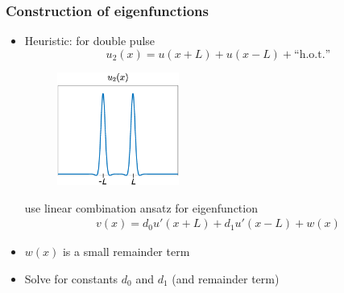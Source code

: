 \documentclass[16pt]{beamer}
\begin{document}
\begin{frame}
\frametitle{Construction of eigenfunctions}
\begin{itemize}
\item Heuristic: for double pulse 
	\[ u_2(x) = u(x+L) + u(x-L) + \text{``h.o.t.''} \]
    	\begin{figure}
		\begin{center}
		\includegraphics[width=4cm]{images/doubleplain.eps}
		\end{center}
		\end{figure}
	use linear combination ansatz for eigenfunction
\begin{align*}
v(x) = d_0 u'(x+L) + d_1 u'(x-L) + w(x)
\end{align*}
\item $w(x)$ is a small remainder term
\item Solve for constants $d_0$ and $d_1$ (and remainder term)
\end{itemize}
\end{frame}
\end{document}
